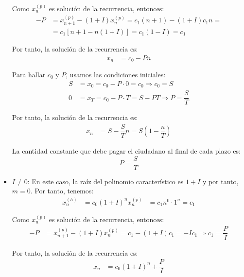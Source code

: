 \begin{ejercicio}
\begin{itemize}
        Como $x_n^{(p)}$ es solución de la recurrencia, entonces:
        \begin{align*}
            -P &= x_{n+1}^{(p)} - (1+I)x_n^{(p)} = c_1(n+1) - (1+I)c_1n
            =\\&= c_1[n+1 - n(1+I)] = c_1(1-I) = c_1
        \end{align*}

        Por tanto, la solución de la recurrencia es:
        \begin{align*}
            x_n &= c_0 -Pn
        \end{align*}

        Para hallar $c_0$ y $P$, usamos las condiciones iniciales:
        \begin{align*}
            S &= x_0 = c_0 - P\cdot 0 = c_0 \Longrightarrow c_0 = S \\
            0 &= x_T = c_0 - P\cdot T = S - PT \Longrightarrow P = \dfrac{S}{T}
        \end{align*}

        Por tanto, la solución de la recurrencia es:
        \begin{align*}
            x_n &= S - \dfrac{S}{T}n = S\left(1-\dfrac{n}{T}\right)
        \end{align*}

        La cantidad constante que debe pagar el ciudadano al final de cada plazo es:
        \begin{equation*}
            P = \dfrac{S}{T}
        \end{equation*}

        \item \ul{$I \neq 0$}: En este caso, la raíz del polinomio característico es $1+I$ y por tanto, $m=0$.
        Por tanto, tenemos:
        \begin{align*}
            x_n^{(h)} &= c_0(1+I)^n
            x_n^{(p)} &= c_1 n^0\cdot 1^n = c_1
        \end{align*}

        Como $x_n^{(p)}$ es solución de la recurrencia, entonces:
        \begin{align*}
            -P &= x_{n+1}^{(p)} - (1+I)x_n^{(p)} = c_1 - (1+I)c_1 = -Ic_1
            \Longrightarrow c_1 = \dfrac{P}{I}
        \end{align*}

        Por tanto, la solución de la recurrencia es:
        \begin{align*}
            x_n &= c_0(1+I)^n + \dfrac{P}{I}
        \end{align*}


\end{itemize}
\end{ejercicio}
